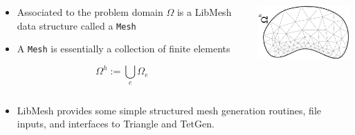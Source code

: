 \begin{frame}
  \begin{columns}[t]
    \begin{block}{}%
      \begin{itemize}
      \item{
	Associated to the problem domain $\Omega$ is a LibMesh data
	structure called a \texttt{Mesh}
      }
	
      \item{A \texttt{Mesh} is essentially
	a collection of finite elements}
      \end{itemize}
      \begin{equation}
	\label{eqn:discretized_domain}
	\nonumber
	\Omega^h:=\bigcup_e \Omega_e
      \end{equation}
    \end{block}
      \begin{center}
	\includegraphics[width=2in,angle=-90]{figures/discretized_domain}
      \end{center}
  \end{columns}
  {
  \begin{itemize}
    \item{LibMesh provides some simple structured mesh generation
routines, file inputs, and interfaces to Triangle and TetGen.}
  \end{itemize}
  }
\end{frame}


